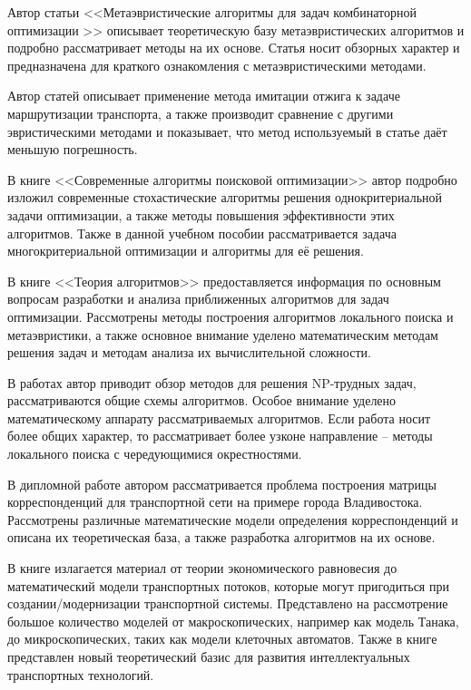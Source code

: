 Автор статьи <<Метаэвристические алгоритмы для задач комбинаторной оптимизации >>\cite{bib:48} описывает 
теоретическую базу метаэвристических алгоритмов и подробно рассматривает методы на их основе. Статья носит 
обзорных характер и предназначена для краткого ознакомления с метаэвристическими методами.

Автор статей \cite{bib:50,bib:51} описывает применение метода имитации отжига к задаче маршрутизации 
транспорта, а также производит сравнение с другими эвристическими методами и показывает, что метод 
используемый в статье даёт меньшую погрешность.

В книге <<Современные алгоритмы поисковой оптимизации>>\cite{bib:52} автор подробно изложил современные 
стохастические алгоритмы решения однокритериальной задачи оптимизации, а также методы повышения 
эффективности этих алгоритмов. Также в данной учебном пособии рассматривается задача многокритериальной 
оптимизации и алгоритмы для её решения.

В книге <<Теория алгоритмов>>\cite{bib:53} предоставляется информация по основным вопросам разработки и 
анализа приближенных алгоритмов для задач оптимизации. Рассмотрены методы построения алгоритмов 
локального поиска и метаэвристики, а также основное внимание уделено математическим методам решения задач 
и методам анализа их вычислительной сложности.

В работах \cite{bib:54,bib:57} автор приводит обзор методов для решения NP-трудных задач, рассматриваются 
общие схемы алгоритмов. Особое внимание уделено математическому аппарату рассматриваемых алгоритмов. 
Если работа \cite{bib:54} носит более общих характер, то \cite{bib:57} рассматривает более узконе 
направление -- методы локального поиска с чередующимися окрестностями.

В дипломной работе \cite{bib:22} автором рассматривается проблема построения матрицы корреспонденций для 
транспортной сети на примере города Владивостока. Рассмотрены различные математические модели определения 
корреспонденций и описана их теоретическая база, а также разработка алгоритмов на их основе.

В книге \cite{bib:23} излагается материал от теории экономического равновесия до математический модели 
транспортных потоков, которые могут пригодиться при создании/модернизации транспортной системы. Представлено 
на рассмотрение большое количество моделей от макроскопических, например как модель Танака, до микроскопических, 
таких как модели клеточных автоматов. Также в книге представлен новый теоретический базис для развития 
интеллектуальных транспортных технологий.

